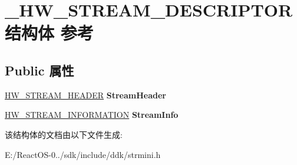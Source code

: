 \hypertarget{struct___h_w___s_t_r_e_a_m___d_e_s_c_r_i_p_t_o_r}{}\section{\+\_\+\+H\+W\+\_\+\+S\+T\+R\+E\+A\+M\+\_\+\+D\+E\+S\+C\+R\+I\+P\+T\+O\+R结构体 参考}
\label{struct___h_w___s_t_r_e_a_m___d_e_s_c_r_i_p_t_o_r}
\subsection*{Public 属性}
\begin{DoxyCompactItemize}
\item 
\mbox{\label{struct___h_w___s_t_r_e_a_m___d_e_s_c_r_i_p_t_o_r_a742105b8bacd9c1fd9a63ea28f209e3e}} 
\hyperlink{struct___h_w___s_t_r_e_a_m___h_e_a_d_e_r}{H\+W\+\_\+\+S\+T\+R\+E\+A\+M\+\_\+\+H\+E\+A\+D\+ER} {\bfseries Stream\+Header}
\item 
\mbox{\label{struct___h_w___s_t_r_e_a_m___d_e_s_c_r_i_p_t_o_r_a7b71eaf86d3b2ed2a547a9f16e9ff295}} 
\hyperlink{struct___h_w___s_t_r_e_a_m___i_n_f_o_r_m_a_t_i_o_n}{H\+W\+\_\+\+S\+T\+R\+E\+A\+M\+\_\+\+I\+N\+F\+O\+R\+M\+A\+T\+I\+ON} {\bfseries Stream\+Info}
\end{DoxyCompactItemize}


该结构体的文档由以下文件生成\+:\begin{DoxyCompactItemize}
\item 
E\+:/\+React\+O\+S-\/0../sdk/include/ddk/strmini.\+h\end{DoxyCompactItemize}
